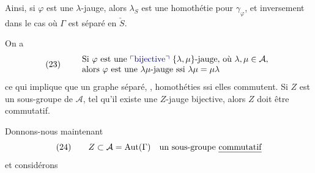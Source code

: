 \documentclass[11pt,a4paper]{article}
\begin{document}
Ainsi, si $\varphi$ est une $\lambda$-jauge, alors $\lambda_S$ est une homothétie pour $\gamma_{\varphi}$, et inversement dans le cas où $\Gamma$ est séparé en $\check{S}$.

 On a
\[
(23) \qquad
\begin{array}{l}
\text{Si } \varphi \text{ est une \add{bijective} } \{\lambda,\mu\}\text{-jauge, où } \lambda, \mu \in \mathcal{A}, \\
\text{alors } \varphi \text{ est une } \lambda\mu\text{-jauge ssi } \lambda\mu = \mu\lambda
\end{array}
\]
ce qui implique que  un graphe séparé, \struck{\ill{}} , \struck{\ill{}} homothéties ssi elles commutent. Si $Z$ est un sous-groupe de $\mathcal{A}$, tel qu'il existe une $Z$-jauge bijective, alors $Z$ doit être commutatif.

Donnons-nous maintenant \struck{\ill{}}
\[
(24) \qquad Z \subset \mathcal{A} = \mathrm{Aut}(\Gamma) \quad \text{un sous-groupe \emph{commutatif}}
\]
et considérons 
\end{document}
